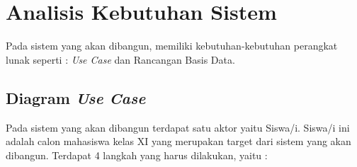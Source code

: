 \section{Analisis Kebutuhan Sistem}
\label{analisis kebutuhan sistem}
Pada sistem yang akan dibangun, memiliki kebutuhan-kebutuhan perangkat lunak seperti : \textit{Use Case} dan Rancangan Basis Data.

\subsection{Diagram \textit{Use Case}}
Pada sistem yang akan dibangun terdapat satu aktor yaitu Siswa/i. Siswa/i ini adalah calon mahasiswa kelas XI yang merupakan target dari sistem yang akan dibangun. Terdapat 4 langkah yang harus dilakukan, yaitu :

